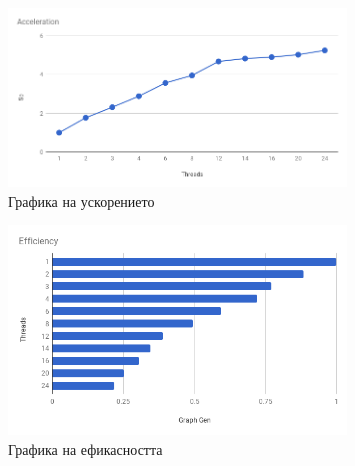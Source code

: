 \begin{figure}[h]
  \centering
  \includegraphics[width=0.8\textwidth]{resources/acceleration.png}
  \caption{\label{fig::acceleration} Графика на ускорението }
\end{figure}

\begin{figure}[h]
  \centering
  \includegraphics[width=0.8\textwidth]{resources/efficiency.png}
  \caption{\label{fig::efficiency} Графика на ефикасността }
\end{figure}
